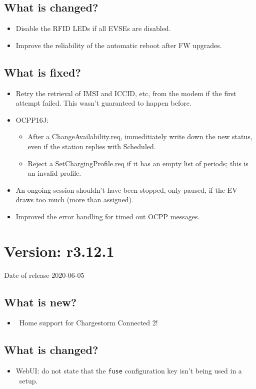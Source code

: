 \documentclass{scrartcl}
\begin{document}
\subsection*{What is changed?}
\begin{itemize}
\item Disable the RFID LEDs if all EVSEs are disabled.
\item Improve the reliability of the automatic reboot after FW upgrades.
\end{itemize}
\subsection*{What is fixed?}
\begin{itemize}
\item  Retry the retrieval of IMSI and ICCID, etc, from the modem if the first
  attempt failed. This wasn’t guaranteed to happen before.
\item OCPP16J:
  \begin{itemize}
  \item  After a ChangeAvailability.req, immeditiately write down the new
    status, even if the station replies with Scheduled.
  \item  Reject a SetChargingProfile.req if it has an empty list of periods;
    this is an invalid profile.
  \end{itemize}
\item  An ongoing session shouldn’t have been stopped, only paused, if the EV
  draws too much (more than assigned).
\item Improved the error handling for timed out OCPP messages.
\end{itemize}

\section{Version: r3.12.1}
Date of release 2020-06-05
\subsection*{What is new?}
\begin{itemize}
\item \nanogrid\ Home support for Chargestorm Connected 2!
\end{itemize}
\subsection*{What is changed?}
\begin{itemize}
\item WebUI: do not state that the \verb|fuse| configuration key isn't being
  used in a \nanogrid\ setup.
\end{itemize}
\end{document}
